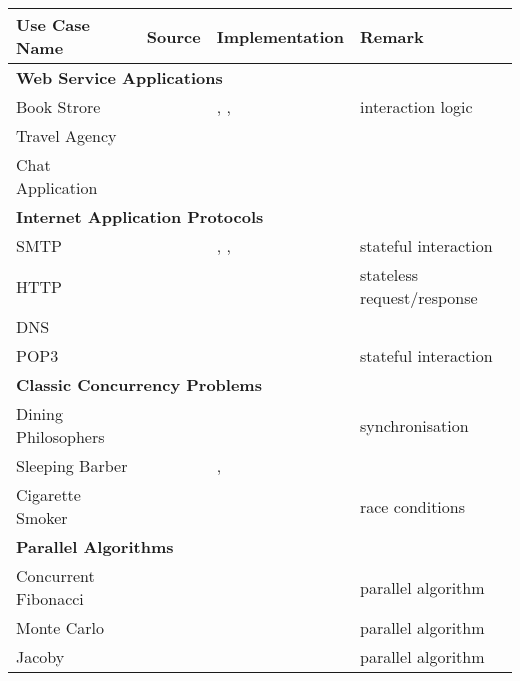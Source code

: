 \begin{table}[!h]
\begin{center}
\begin{tabular}{|l|l|l|l|}
	\hline
	Use Case Name & Source & Implementation & Remark
	\\

	\hline
	\hline
	\multicolumn{4}{|l|}{ \textbf{Web Service Applications}}
	\\
	\hline
	Book Strore & \cite{W3C} & \SJ, \Mungo, \JavaAPI  & interaction logic
	\\
	Travel Agency & \cite{W3C} & \SJ &
	\\
	Chat Application & \cite{SF15} & \Erlang &
	\\

	\hline
	\hline
	\multicolumn{4}{|l|}{ \textbf{Internet Application Protocols}}
	\\
	\hline
	SMTP & \cite{RFC} & \JavaAPI, \TypeState, \Links & stateful interaction
	\\
	HTTP & \cite{RFC} & \JavaAPI &	stateless request/response
	\\
	DNS & \cite{RFC,SF15} & \Erlang &
	\\
	POP3 & \cite{RFC} & \TypeState & stateful interaction
	\\

	\hline
	\hline
	\multicolumn{4}{|l|}{ \textbf{Classic Concurrency Problems}}
	\\
	\hline
	Dining Philosophers & \cite{Savina} & \SPython  & synchronisation
	\\
	Sleeping Barber & \cite{Savina} & \SPython, \SScala &
	\\
	Cigarette Smoker & \cite{Savina} & \SPython & race conditions
	\\
	
	\hline
	\hline
	\multicolumn{4}{|l|}{ \textbf{Parallel Algorithms}}
	\\
	\hline
	Concurrent Fibonacci &  & \Mungo & parallel algorithm
	\\
	Monte Carlo & \cite{citation_needed} & \MPI & parallel algorithm
	\\
	Jacoby & \cite{citation_needed} & \MPI & parallel algorithm
	\\
		


\end{tabular}
\end{center}
\end{table}
